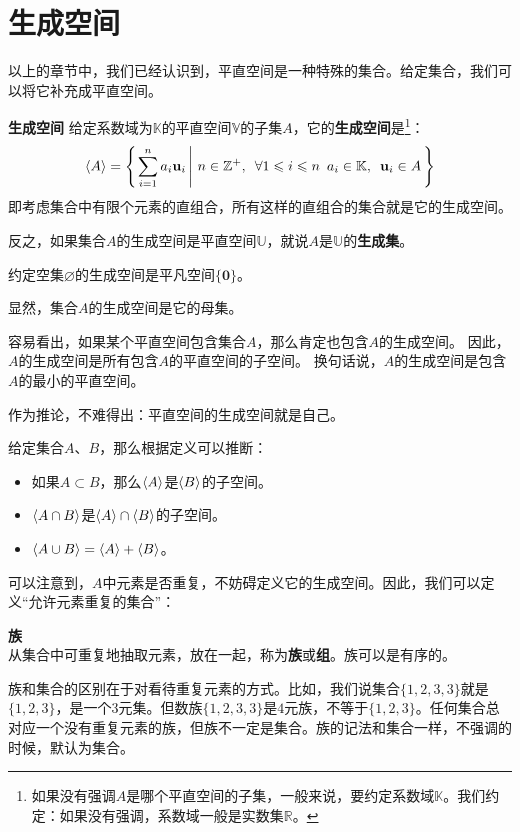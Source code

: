 \documentclass[12pt,UTF8]{ctexbook}
\begin{document}
\section{生成空间}
以上的章节中，我们已经认识到，平直空间是一种特殊的集合。给定集合，我们可以将它补充成平直空间。
\begin{df}{\textbf{生成空间}}
    给定系数域为$\mathbb{K}$的平直空间$\mathbb{V}$的子集$A$，它的\textbf{生成空间}是\footnote{如果没有强调$A$是哪个平直空间的子集，一般来说，要约定系数域$\mathbb{K}$。我们约定：如果没有强调，系数域一般是实数集$\mathbb{R}$。}：
    $$ \left\langle A \right\rangle = \left\{\left. \sum_{i=1}^n a_i \mathbf{u}_i \, \right| \, n\in\mathbb{Z}^+, \,\,\, \forall 1\leqslant i \leqslant n \,\,\, a_i \in \mathbb{K}, \,\,\, \mathbf{u}_i \in A\, \right\} $$
    即考虑集合中有限个元素的直组合，所有这样的直组合的集合就是它的生成空间。
    
    反之，如果集合$A$的生成空间是平直空间$\mathbb{U}$，就说$A$是$\mathbb{U}$的\textbf{生成集}。

    约定空集$\varnothing$的生成空间是平凡空间$\{\mathbf{0}\}$。
\end{df}

显然，集合$A$的生成空间是它的母集。

容易看出，如果某个平直空间包含集合$A$，那么肯定也包含$A$的生成空间。
因此，$A$的生成空间是所有包含$A$的平直空间的子空间。
换句话说，$A$的生成空间是包含$A$的最小的平直空间。

作为推论，不难得出：平直空间的生成空间就是自己。

给定集合$A$、$B$，那么根据定义可以推断：
\begin{itemize}
    \item 如果$A\subset B$，那么$\left\langle A \right\rangle$是$\left\langle B \right\rangle$的子空间。
    \item $\left\langle A\cap B \right\rangle$是$\left\langle A \right\rangle\cap\left\langle B \right\rangle$的子空间。
    \item $\left\langle A\cup B \right\rangle = \left\langle A \right\rangle + \left\langle B \right\rangle$。
\end{itemize}

可以注意到，$A$中元素是否重复，不妨碍定义它的生成空间。因此，我们可以定义“允许元素重复的集合”：
\begin{df}{\textbf{族}}
    \mbox{} \\
    从集合中可重复地抽取元素，放在一起，称为\textbf{族}或\textbf{组}。族可以是有序的。
\end{df}
族和集合的区别在于对看待重复元素的方式。比如，我们说集合$\{1,2,3,3\}$就是$\{1,2,3\}$，是一个$3$元集。但数族$\{1,2,3,3\}$是$4$元族，不等于$\{1,2,3\}$。任何集合总对应一个没有重复元素的族，但族不一定是集合。族的记法和集合一样，不强调的时候，默认为集合。
\end{document}
